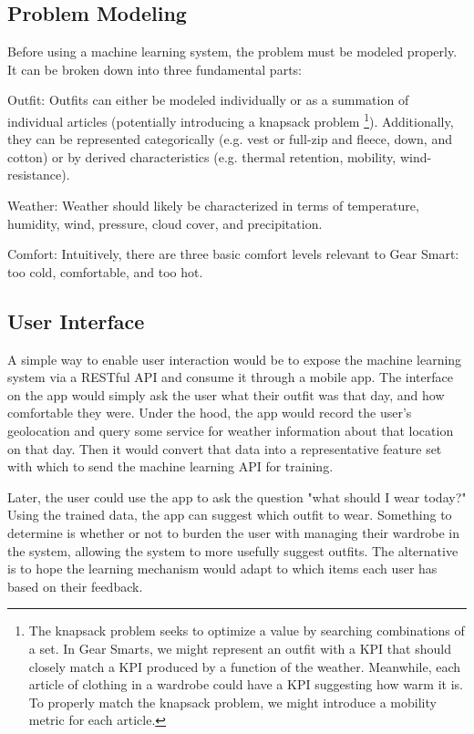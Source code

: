 \subsection{Problem Modeling}
Before using a machine learning system, the problem must be modeled properly. It can be broken down into three fundamental parts:

\begin{description}
  \item{Outfit:} Outfits can either be modeled individually or as a summation of individual articles (potentially introducing
  a knapsack problem \footnote{The knapsack problem seeks to optimize a value by searching combinations of a set. In Gear Smarts,
  we might represent an outfit with a KPI that should closely match a KPI produced by a function of the weather. Meanwhile, each
  article of clothing in a wardrobe could have a KPI suggesting how warm it is. To properly match the knapsack problem, we might
  introduce a mobility metric for each article.}). Additionally, they can be represented categorically (e.g. vest or full-zip and
  fleece, down, and cotton) or by derived characteristics (e.g. thermal retention, mobility, wind-resistance).
  \item{Weather:} Weather should likely be characterized in terms of temperature, humidity, wind, pressure,
  cloud cover, and precipitation.
  \item{Comfort:} Intuitively, there are three basic comfort levels relevant to Gear Smart: too cold, comfortable, and too hot.
\end{description}

\subsection{User Interface}
A simple way to enable user interaction would be to expose the machine learning system via a RESTful API and consume it
through a mobile app. The interface on the app would simply ask the user what their outfit was that day, and how comfortable
they were. Under the hood, the app would record the user's geolocation and query some service for weather information
about that location on that day. Then it would convert that data into a representative feature set with which to send
the machine learning API for training.

Later, the user could use the app to ask the question "what should I wear today?" Using the trained data, the app can
suggest which outfit to wear. Something to determine is whether or not to burden the user with managing
their wardrobe in the system, allowing the system to more usefully suggest outfits. The alternative is to hope the
learning mechanism would adapt to which items each user has based on their feedback.
